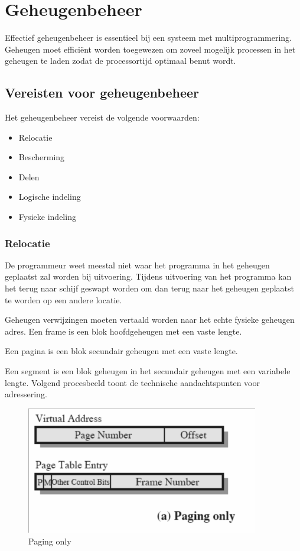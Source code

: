 \section{Geheugenbeheer}

Effectief geheugenbeheer is essentieel bij een systeem met multiprogrammering. Geheugen moet efficiënt worden toegewezen om zoveel mogelijk processen in het geheugen te laden zodat de processortijd optimaal benut wordt.

\subsection{Vereisten voor geheugenbeheer}

Het geheugenbeheer vereist de volgende voorwaarden:

\begin{itemize}
\item Relocatie
\item Bescherming
\item Delen
\item Logische indeling
\item Fysieke indeling
\end{itemize}

\subsubsection{Relocatie}

De programmeur weet meestal niet waar het programma in het geheugen geplaatst zal worden bij uitvoering. Tijdens uitvoering van het programma kan het terug naar schijf geswapt worden om dan terug naar het geheugen geplaatst te worden op een andere locatie.

Geheugen verwijzingen moeten vertaald worden naar het echte fysieke geheugen adres. Een frame is een blok hoofdgeheugen met een vaste lengte.

Een pagina is een blok secundair geheugen met een vaste lengte.

Een segment is een blok geheugen in het secundair geheugen met een variabele lengte. Volgend procesbeeld toont de technische aandachtspunten voor adressering.



\begin{figure}[htp]
    \centering
            \includegraphics[width=4in]{img/pagineren.png}
        \caption{Paging only}
    \label{fig:Paging only}
\end{figure}


